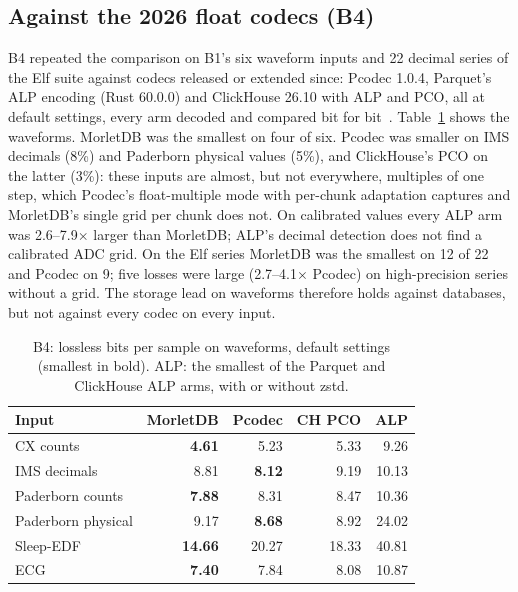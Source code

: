 \documentclass[sigconf,nonacm]{acmart}
\newcommand{\M}{MorletDB}
\begin{document}
\subsection{Against the 2026 float codecs (B4)}
B4 repeated the comparison on B1's six waveform inputs and 22 decimal series of the Elf suite against codecs released or extended since: Pcodec 1.0.4, Parquet's ALP encoding (Rust  60.0.0) and ClickHouse 26.10 with ALP and PCO, all at default settings, every arm decoded and compared bit for bit~\cite{b4}. Table~\ref{tab:b4} shows the waveforms. \M{} was the smallest on four of six. Pcodec was smaller on IMS decimals (8\%) and Paderborn physical values (5\%), and ClickHouse's PCO on the latter (3\%): these inputs are almost, but not everywhere, multiples of one step, which Pcodec's float-multiple mode with per-chunk adaptation captures and \M{}'s single grid per chunk does not. On calibrated values every ALP arm was 2.6--7.9$\times$ larger than \M{}; ALP's decimal detection does not find a calibrated ADC grid. On the Elf series \M{} was the smallest on 12 of 22 and Pcodec on 9; five losses were large (2.7--4.1$\times$ Pcodec) on high-precision series without a grid. The storage lead on waveforms therefore holds against databases, but not against every codec on every input.

\begin{table}[t]
\caption{B4: lossless bits per sample on waveforms, default settings (smallest in bold). ALP: the smallest of the Parquet and ClickHouse ALP arms, with or without zstd.}
\label{tab:b4}
\small\setlength{\tabcolsep}{4pt}
\begin{tabular}{@{}lrrrr@{}}
\toprule
Input & \M{} & Pcodec & CH PCO & ALP \\
\midrule
CX counts & \textbf{4.61} & 5.23 & 5.33 & 9.26 \\
IMS decimals & 8.81 & \textbf{8.12} & 9.19 & 10.13 \\
Paderborn counts & \textbf{7.88} & 8.31 & 8.47 & 10.36 \\
Paderborn physical & 9.17 & \textbf{8.68} & 8.92 & 24.02 \\
Sleep-EDF & \textbf{14.66} & 20.27 & 18.33 & 40.81 \\
ECG & \textbf{7.40} & 7.84 & 8.08 & 10.87 \\
\bottomrule
\end{tabular}
\end{table}
\end{document}
